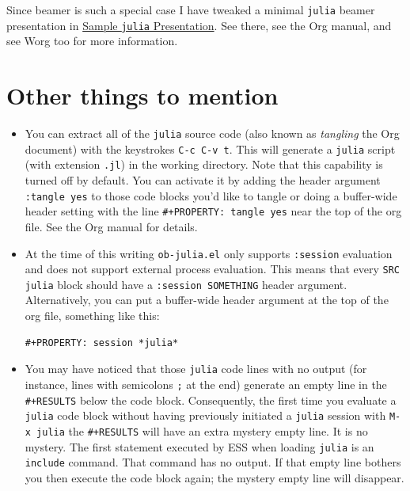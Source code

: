\documentclass[11pt]{article}
\begin{document}
Since beamer is such a special case I have tweaked a minimal \texttt{julia}
beamer presentation in \href{file://ob-julia-beamer.org}{Sample \texttt{julia} Presentation}. See there, see the
Org manual, and see Worg too for more information.
\section[Other things to mention]{Other things to mention}
\label{sec-5}

\begin{itemize}
\item You can extract all of the \texttt{julia} source code (also known as
\emph{tangling} the Org document) with the keystrokes \texttt{C-c C-v t}.  This
will generate a \texttt{julia} script (with extension \texttt{.jl}) in the working
directory.  Note that this capability is turned off by default.  You
can activate it by adding the header argument \texttt{:tangle yes} to those
code blocks you'd like to tangle or doing a buffer-wide header
setting with the line \texttt{\#+PROPERTY: tangle yes} near the top of the
org file.  See the Org manual for details.

\item At the time of this writing \texttt{ob-julia.el} only supports \texttt{:session}
evaluation and does not support external process evaluation. This
means that every \texttt{SRC julia} block should have a \texttt{:session
  SOMETHING} header argument.  Alternatively, you can put a
buffer-wide header argument at the top of the org file, something
like this:

\begin{verbatim}
#+PROPERTY: session *julia*
\end{verbatim}

\item You may have noticed that those \texttt{julia} code lines with no output
(for instance, lines with semicolons \texttt{;} at the end) generate an
empty line in the \texttt{\#+RESULTS} below the code block.  Consequently,
the first time you evaluate a \texttt{julia} code block without having
previously initiated a \texttt{julia} session with \texttt{M-x julia} the
\texttt{\#+RESULTS} will have an extra mystery empty line.  It is no
mystery.  The first statement executed by ESS when loading \texttt{julia}
is an \texttt{include} command.  That command has no output.  If that empty
line bothers you then execute the code block again; the mystery
empty line will disappear.


\end{itemize}
\end{document}
